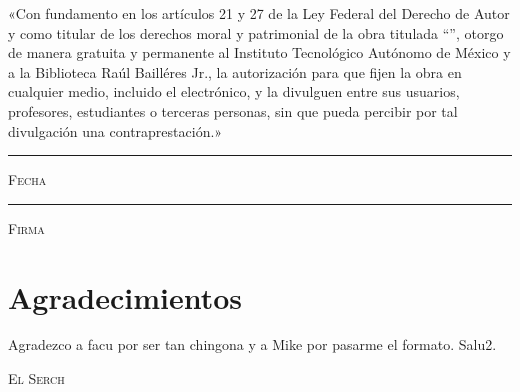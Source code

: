 \documentclass[11pt, oneside]{book}
\begin{document}
\thispagestyle{empty}

\vspace*{\fill}
\begingroup

\noindent
«Con fundamento en los artículos 21 y 27 de la Ley Federal del Derecho de Autor y como titular de los derechos moral y patrimonial de la obra titulada ``\textbf{\thetitle}'', otorgo de manera gratuita y permanente al Instituto Tecnológico Autónomo de México y a la Biblioteca Raúl Bailléres Jr., la autorización para que fijen la obra en cualquier medio, incluido el electrónico, y la divulguen entre sus usuarios, profesores, estudiantes o terceras personas, sin que pueda percibir por tal divulgación una contraprestación.»


\centering 

\vspace{3em}

\textsc{\theauthor}

\vspace{5em}

\rule[1em]{20em}{0.5pt} %

\textsc{Fecha}
 
\vspace{8em}

\rule[1em]{20em}{0.5pt} %

\textsc{Firma}

\endgroup
\vspace*{\fill}

\newpage



\thispagestyle{empty}

\chapter*{Agradecimientos}

Agradezco a facu por ser tan chingona y a Mike por pasarme el formato. Salu2.
\begin{flushright}
\textsc{El Serch}
\end{flushright}
\newpage


\pagestyle{plain}
\frontmatter

\end{document}
